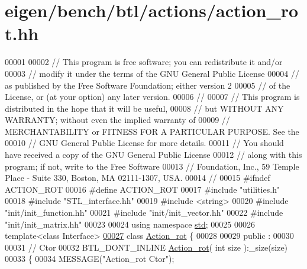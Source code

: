 \hypertarget{eigen_2bench_2btl_2actions_2action__rot_8hh_source}{}\section{eigen/bench/btl/actions/action\+\_\+rot.hh}
\label{eigen_2bench_2btl_2actions_2action__rot_8hh_source}

\begin{DoxyCode}
00001 
00002 \textcolor{comment}{// This program is free software; you can redistribute it and/or}
00003 \textcolor{comment}{// modify it under the terms of the GNU General Public License}
00004 \textcolor{comment}{// as published by the Free Software Foundation; either version 2}
00005 \textcolor{comment}{// of the License, or (at your option) any later version.}
00006 \textcolor{comment}{//}
00007 \textcolor{comment}{// This program is distributed in the hope that it will be useful,}
00008 \textcolor{comment}{// but WITHOUT ANY WARRANTY; without even the implied warranty of}
00009 \textcolor{comment}{// MERCHANTABILITY or FITNESS FOR A PARTICULAR PURPOSE.  See the}
00010 \textcolor{comment}{// GNU General Public License for more details.}
00011 \textcolor{comment}{// You should have received a copy of the GNU General Public License}
00012 \textcolor{comment}{// along with this program; if not, write to the Free Software}
00013 \textcolor{comment}{// Foundation, Inc., 59 Temple Place - Suite 330, Boston, MA  02111-1307, USA.}
00014 \textcolor{comment}{//}
00015 \textcolor{preprocessor}{#ifndef ACTION\_ROT}
00016 \textcolor{preprocessor}{#define ACTION\_ROT}
00017 \textcolor{preprocessor}{#include "utilities.h"}
00018 \textcolor{preprocessor}{#include "STL\_interface.hh"}
00019 \textcolor{preprocessor}{#include <string>}
00020 \textcolor{preprocessor}{#include "init/init\_function.hh"}
00021 \textcolor{preprocessor}{#include "init/init\_vector.hh"}
00022 \textcolor{preprocessor}{#include "init/init\_matrix.hh"}
00023 
00024 \textcolor{keyword}{using namespace }\hyperlink{namespacestd}{std};
00025 
00026 \textcolor{keyword}{template}<\textcolor{keyword}{class} Interface>
\hyperlink{class_action__rot}{00027} \textcolor{keyword}{class }\hyperlink{class_action__rot}{Action\_rot} \{
00028 
00029 public :
00030 
00031   \textcolor{comment}{// Ctor}
00032   BTL\_DONT\_INLINE \hyperlink{class_action__rot}{Action\_rot}( \textcolor{keywordtype}{int} size ):\_size(size)
00033   \{
00034     MESSAGE(\textcolor{stringliteral}{"Action\_rot Ctor"});

\end{DoxyCode}
